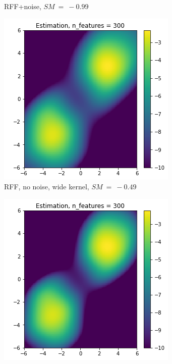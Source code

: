 \begin{figure}[!ht]
\begin{subfigure}[b]{0.32\textwidth}
    \captionsetup{justification=centering}
    \caption{RFF+noise, $SM~=~-0.99$}
    \label{sfig:MoGnoise}
  \end{subfigure}
  \begin{subfigure}[b]{0.32\textwidth}
    \includegraphics[width=\textwidth]{figures/score_matching/exps/MOG_rff.png}
    \captionsetup{justification=centering}
    \caption{RFF, no noise, wide kernel, $SM~=~-0.49$}
    \label{sfig:MoGrff_1}
  \end{subfigure}
  \begin{subfigure}[b]{0.32\textwidth}
    \includegraphics[width=\textwidth]{figures/score_matching/exps/MOG_noise.png}

\end{subfigure}
\end{figure}
